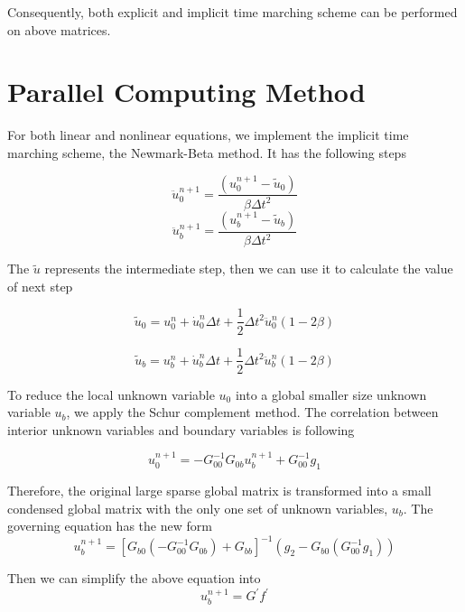 Consequently, both explicit and implicit time marching scheme can be performed on above matrices.

\section{Parallel Computing Method}

For both linear and nonlinear equations, we implement the implicit time marching scheme, the Newmark-Beta method. It has the following steps

\begin{equation}
\ddot{u}_{0}^{n+1} = \frac{(u_{0}^{n+1} - \tilde{u}_{0})}{\beta \Delta t^{2}}
\end{equation}
\begin{equation}
\ddot{u}_{b}^{n+1} = \frac{(u_{b}^{n+1} - \tilde{u}_{b})}{\beta \Delta t^{2}}
\end{equation}

The $ \tilde{u} $ represents the intermediate step, then we can use it to calculate the value of next step

\begin{equation}
\tilde{u}_{0} = u_{0}^{n} + \dot{u}_{0}^{n} \Delta t + \frac{1}{2} \Delta t^{2} \ddot{u}_{0}^{n} (1 - 2 \beta)
\end{equation}

\begin{equation}
\tilde{u}_{b} = u_{b}^{n} + \dot{u}_{b}^{n} \Delta t + \frac{1}{2} \Delta t^{2} \ddot{u}_{b}^{n} (1 - 2 \beta)
\end{equation}

To reduce the local unknown variable $ u_{0} $ into a global smaller size unknown variable $ u_{b} $, we apply the Schur complement method. The correlation between interior unknown variables and boundary variables is following

\begin{equation}
u_{0}^{n+1} = -G_{00}^{-1} G_{0b} u_{b}^{n+1} + G_{00}^{-1} g_{1}
\end{equation}

Therefore, the original large sparse global matrix is transformed into a small condensed global matrix with the only one set of unknown variables, $ u_{b} $. The governing equation has the new form
\begin{equation}
u_{b}^{n+1} = [G_{b0}(-G_{00}^{-1}G_{0b}) + G_{bb}]^{-1} (g_{2} - G_{b0} (G_{00}^{-1} g_{1}))
\end{equation}

Then we can simplify the above equation into
\begin{equation}
u_{b}^{n+1} = G^{'} f^{'}
\end{equation}

